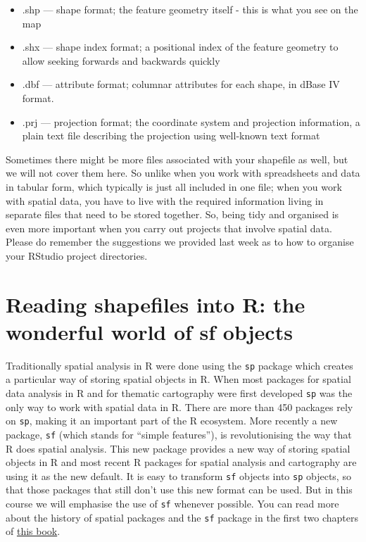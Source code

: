 \documentclass[]{book}
\providecommand{\tightlist}{%
  \setlength{\itemsep}{0pt}\setlength{\parskip}{0pt}}
\begin{document}
\begin{itemize}
\tightlist
\item
  .shp --- shape format; the feature geometry itself - this is what you see on the map
\item
  .shx --- shape index format; a positional index of the feature geometry to allow seeking forwards and backwards quickly
\item
  .dbf --- attribute format; columnar attributes for each shape, in dBase IV format.
\item
  .prj --- projection format; the coordinate system and projection information, a plain text file describing the projection using well-known text format
\end{itemize}

Sometimes there might be more files associated with your shapefile as well, but we will not cover them here. So unlike when you work with spreadsheets and data in tabular form, which typically is just all included in one file; when you work with spatial data, you have to live with the required information living in separate files that need to be stored together. So, being tidy and organised is even more important when you carry out projects that involve spatial data. Please do remember the suggestions we provided last week as to how to organise your RStudio project directories.

\hypertarget{reading-shapefiles-into-r-the-wonderful-world-of-sf-objects}{%
\section{Reading shapefiles into R: the wonderful world of sf objects}\label{reading-shapefiles-into-r-the-wonderful-world-of-sf-objects}}

Traditionally spatial analysis in R were done using the \texttt{sp} package which creates a particular way of storing spatial objects in R. When most packages for spatial data analysis in R and for thematic cartography were first developed \texttt{sp} was the only way to work with spatial data in R. There are more than 450 packages rely on \texttt{sp}, making it an important part of the R ecosystem. More recently a new package, \texttt{sf} (which stands for ``simple features''), is revolutionising the way that R does spatial analysis. This new package provides a new way of storing spatial objects in R and most recent R packages for spatial analysis and cartography are using it as the new default. It is easy to transform \texttt{sf} objects into \texttt{sp} objects, so that those packages that still don't use this new format can be used. But in this course we will emphasise the use of \texttt{sf} whenever possible. You can read more about the history of spatial packages and the \texttt{sf} package in the first two chapters of \href{https://geocompr.robinlovelace.net}{this book}.
\end{document}
